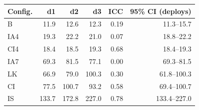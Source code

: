 \begin{tabular}{@{}lrrrrr@{}}
\toprule
Config. & d1 & d2 & d3 & ICC & 95\% CI (deploys) \\
\midrule
B & 11.9 & 12.6 & 12.3 & 0.19 & 11.3--15.7 \\
IA4 & 19.3 & 22.2 & 21.0 & 0.07 & 18.8--22.2 \\
CI4 & 18.4 & 18.5 & 19.3 & 0.68 & 18.4--19.3 \\
IA7 & 69.3 & 81.5 & 77.1 & 0.00 & 69.3--81.5 \\
LK & 66.9 & 79.0 & 100.3 & 0.30 & 61.8--100.3 \\
CI & 77.5 & 100.7 & 93.2 & 0.58 & 69.4--100.7 \\
IS & 133.7 & 172.8 & 227.0 & 0.78 & 133.4--227.0 \\
\bottomrule
\end{tabular}
